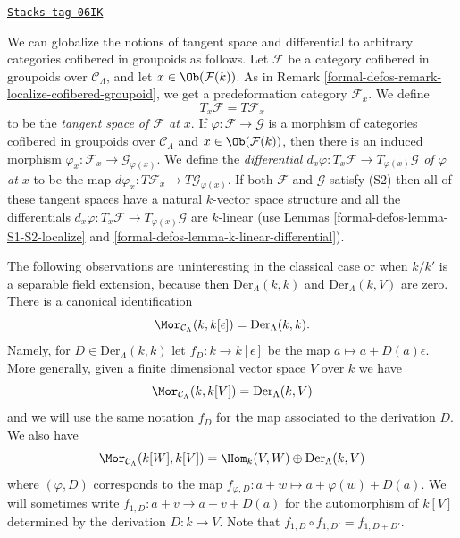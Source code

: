 \begin{remark}
\label{formal-defos-remark-tangent-space-cofibered-groupoid}
\href{https://stacks.math.columbia.edu/tag/06IK}{\texttt{Stacks tag 06IK}}

We can globalize the notions of tangent space and differential to arbitrary
categories cofibered in groupoids as follows. Let $\mathcal{F}$ be a category
cofibered in groupoids over $\mathcal{C}_\Lambda$, and let
$x \in \Ob(\mathcal{F}(k))$. As in
Remark \ref{formal-defos-remark-localize-cofibered-groupoid},
we get a predeformation category $\mathcal{F}_x$. We define
$$
T_x\mathcal{F} = T\mathcal{F}_x
$$
to be the {\it tangent space of $\mathcal{F}$ at $x$}. If
$\varphi : \mathcal{F} \to \mathcal{G}$ is a morphism of categories cofibered
in groupoids over $\mathcal{C}_\Lambda$ and $x \in \Ob(\mathcal{F}(k))$,
then there is an induced morphism
$\varphi_x: \mathcal{F}_x \to \mathcal{G}_{\varphi(x)}$. We define the
{\it differential
$d_x \varphi : T_x \mathcal{F} \to T_{\varphi(x)} \mathcal{G}$
of $\varphi$ at $x$} to be the map
$d \varphi_x: T \mathcal{F}_x \to T \mathcal{G}_{\varphi(x)}$.
If both $\mathcal{F}$ and $\mathcal{G}$ satisfy (S2) then
all of these tangent spaces have a natural $k$-vector space structure
and all the differentials
$d_x \varphi : T_x \mathcal{F} \to T_{\varphi(x)} \mathcal{G}$
are $k$-linear (use
Lemmas \ref{formal-defos-lemma-S1-S2-localize} and \ref{formal-defos-lemma-k-linear-differential}).
\end{remark}

The following observations are uninteresting in the classical case or when
$k/k'$ is a separable field extension, because then
$\text{Der}_\Lambda(k, k)$ and $\text{Der}_\Lambda(k, V)$ are zero.
There is a canonical identification
$$
\Mor_{\mathcal{C}_\Lambda}(k, k[\epsilon]) =
\text{Der}_\Lambda(k, k).
$$
Namely, for $D \in \text{Der}_\Lambda(k, k)$ let $f_D : k \to k[\epsilon]$
be the map $a \mapsto a + D(a)\epsilon$. More generally, given a finite
dimensional vector space $V$ over $k$ we have
$$
\Mor_{\mathcal{C}_\Lambda}(k, k[V]) =
\text{Der}_\Lambda(k, V)
$$
and we will use the same notation $f_D$ for the map associated to the
derivation $D$. We also have
$$
\Mor_{\mathcal{C}_\Lambda}(k[W], k[V]) =
\Hom_k(V, W) \oplus \text{Der}_\Lambda(k, V)
$$
where $(\varphi, D)$ corresponds to the map
$f_{\varphi, D} : a + w \mapsto a + \varphi(w) + D(a)$. We will sometimes write
$f_{1, D} : a + v \to a + v + D(a)$ for the automorphism
of $k[V]$ determined by the derivation $D : k \to V$. Note that
$f_{1, D} \circ f_{1, D'} = f_{1, D + D'}$.

